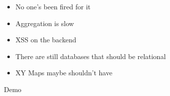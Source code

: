 \documentclass{beamer}
\begin{document}
\begin{slide}%

\begin{itemize}
\item No one's been fired for it
\item Aggregation is slow
\item XSS on the backend
\item There are still databases that should be relational
\item XY Maps maybe shouldn't have
\end{itemize}

\end{slide}


\begin{slide}%

\begin{center}
   Demo
\end{center}

\end{slide}


\begin{slide}%

\begin{lstlisting}
\end{lstlisting}

\end{slide}


\begin{slide}%

\begin{lstlisting}
\end{lstlisting}

\end{slide}


\begin{slide}%

\begin{lstlisting}
\end{lstlisting}

\end{slide}


\begin{slide}%

\begin{lstlisting}
\end{lstlisting}

\end{slide}
\end{document}
